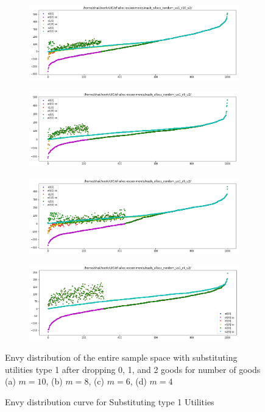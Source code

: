 \begin{figure}[h!]
  \centering
  \begin{subfigure}[b]{0.47\linewidth}
    \includegraphics[width=\linewidth]{images/subst1/pdf_subst1_10.png}
    \caption{}
  \end{subfigure}
  \begin{subfigure}[b]{0.47\linewidth}
    \includegraphics[width=\linewidth]{images/subst1/pdf_subst1_8.png}
    \caption{}
  \end{subfigure}
  \begin{subfigure}[b]{0.47\linewidth}
    \includegraphics[width=\linewidth]{images/subst1/pdf_subst1_6.png}
    \caption{}
  \end{subfigure}
  \begin{subfigure}[b]{0.47\linewidth}
    \includegraphics[width=\linewidth]{images/subst1/pdf_subst1_4.png}
    \caption{}
  \end{subfigure}
  \caption{Envy distribution curve for Substituting type 1 Utilities}
  \label{fig:efk}
  \small
    Envy distribution of the entire sample space with substituting utilities type 1 after dropping 0, 1, and 2 goods for number of goods (a) $m = 10$, (b) $m = 8$, (c) $m = 6$, (d) $m = 4$
\end{figure}

